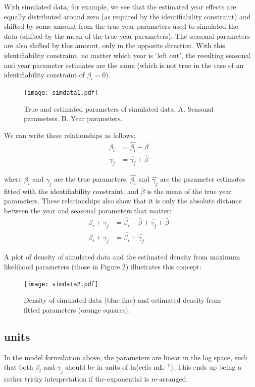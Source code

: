 \documentclass[11pt]{article}
\begin{document}
With simulated data, for example, we see that the estimated year effects are equally distributed around zero (as required by the identifiability constraint) and shifted by some amount from the true year parameters used to simulated the data (shifted by the mean of the true year parameters). The seasonal parameters are also shifted by this amount, only in the opposite direction. With this identifiability constraint, no matter which year is `left out', the resulting seasonal and year parameter estimates are the same (which is not true in the case of an identifiability constraint of $\beta_i=0$).

\begin{figure}[h]
\centering
\texttt{[image: simdata1.pdf]}
\caption{True and estimated parameters of simulated data. A. Seasonal parameters. B. Year parameters.}
\end{figure}

\clearpage

We can write these relationships as follows:
\begin{align}
\beta_i &= \hat{\beta_i} - \bar{\beta}\label{eqn1} \\
\gamma_j &= \hat{\gamma_j} + \bar{\beta} \label{eqn2}
\end{align}

\noindent where $\beta_i$ and $\gamma_j$ are the true parameters, $\hat{\beta_i}$ and $\hat{\gamma_j}$ are the parameter estimates fitted with the identifiability constraint, and $\bar{\beta}$ is the mean of the true year parameters. These relationships also show that it is only the absolute distance between the year and seasonal parameters that matter:
\begin{align}
\beta_i + \gamma_j &= \hat{\beta_i} - \bar{\beta} + \hat{\gamma_j} + \bar{\beta} \\
\beta_i + \gamma_j &= \hat{\beta_i} + \hat{\gamma_j} \label{eqn4}
\end{align}


A plot of density of simulated data and the estimated density from maximum likelihood parameters (those in Figure 2) illustrates this concept:
 
 \begin{figure}[h]
\centering
\texttt{[image: simdata2.pdf]}
\caption{Density of simulated data (blue line) and estimated density from fitted parameters (orange squares).}
\end{figure}


\subsection{units}
 In the model formulation above, the parameters are linear in the log space, such that both $\beta_i$ and $\gamma_j$ should be in units of ln(cells mL$^{-1}$). This ends up being a rather tricky interpretation if the exponential is re-arranged:
\end{document}
